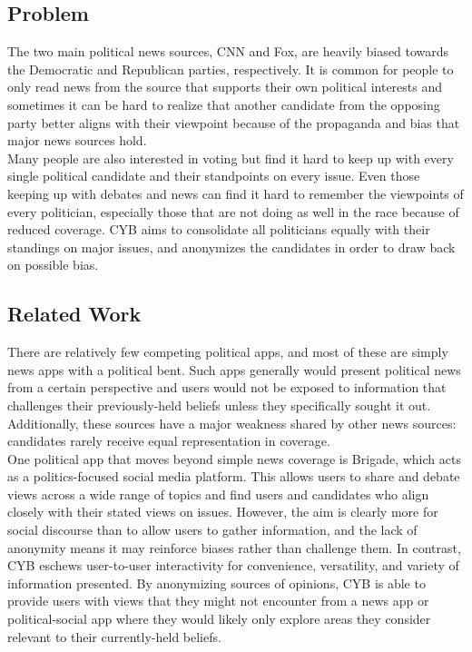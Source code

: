 \documentclass[11pt]{article}
\begin{document}
\subsection*{Problem}

The two main political news sources, CNN and Fox, are heavily biased towards the Democratic and Republican parties, respectively. It is common for people to only read news from the source that supports their own political interests and sometimes it can be hard to realize that another candidate from the opposing party better aligns with their viewpoint because of the propaganda and bias that major news sources hold. \\

Many people are also interested in voting but find it hard to keep up with every single political candidate and their standpoints on every issue. Even those keeping up with debates and news can find it hard to remember the viewpoints of every politician, especially those that are not doing as well in the race because of reduced coverage. CYB aims to consolidate all politicians equally with their standings on major issues, and anonymizes the candidates in order to draw back on possible bias.

\subsection*{Related Work}

There are relatively few competing political apps, and most of these are simply news apps with a political bent. Such apps generally would present political news from a certain perspective and users would not be exposed to information that challenges their previously-held beliefs unless they specifically sought it out. Additionally, these sources have a major weakness shared by other news sources: candidates rarely receive equal representation in coverage.\\

One political app that moves beyond simple news coverage is Brigade, which acts as a politics-focused social media platform. This allows users to share and debate views across a wide range of topics and find users and candidates who align closely with their stated views on issues. However, the aim is clearly more for social discourse than to allow users to gather information, and the lack of anonymity means it may reinforce biases rather than challenge them. In contrast, CYB eschews user-to-user interactivity for convenience, versatility, and variety of information presented. By anonymizing sources of opinions, CYB is able to provide users with views that they might not encounter from a news app or political-social app where they would likely only explore areas they consider relevant to their currently-held beliefs.
\end{document}
